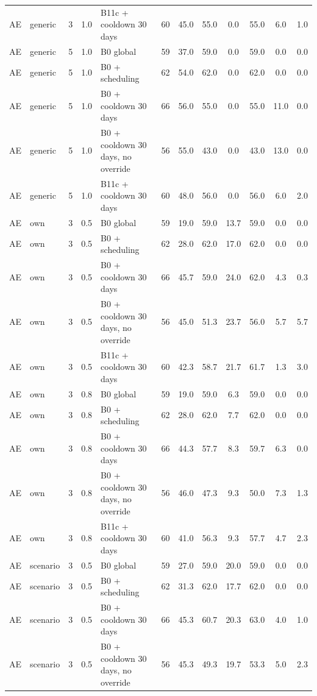 \begin{longtable}{lllllccccccc}
AE & generic & 3 & 1.0 & B11c + cooldown 30 days & 60 & 45.0 & 55.0 & 0.0 & 55.0 & 6.0 & 1.0 \\
AE & generic & 5 & 1.0 & B0 global & 59 & 37.0 & 59.0 & 0.0 & 59.0 & 0.0 & 0.0 \\
AE & generic & 5 & 1.0 & B0 + scheduling & 62 & 54.0 & 62.0 & 0.0 & 62.0 & 0.0 & 0.0 \\
AE & generic & 5 & 1.0 & B0 + cooldown 30 days & 66 & 56.0 & 55.0 & 0.0 & 55.0 & 11.0 & 0.0 \\
AE & generic & 5 & 1.0 & B0 + cooldown 30 days, no override & 56 & 55.0 & 43.0 & 0.0 & 43.0 & 13.0 & 0.0 \\
AE & generic & 5 & 1.0 & B11c + cooldown 30 days & 60 & 48.0 & 56.0 & 0.0 & 56.0 & 6.0 & 2.0 \\
AE & own & 3 & 0.5 & B0 global & 59 & 19.0 & 59.0 & 13.7 & 59.0 & 0.0 & 0.0 \\
AE & own & 3 & 0.5 & B0 + scheduling & 62 & 28.0 & 62.0 & 17.0 & 62.0 & 0.0 & 0.0 \\
AE & own & 3 & 0.5 & B0 + cooldown 30 days & 66 & 45.7 & 59.0 & 24.0 & 62.0 & 4.3 & 0.3 \\
AE & own & 3 & 0.5 & B0 + cooldown 30 days, no override & 56 & 45.0 & 51.3 & 23.7 & 56.0 & 5.7 & 5.7 \\
AE & own & 3 & 0.5 & B11c + cooldown 30 days & 60 & 42.3 & 58.7 & 21.7 & 61.7 & 1.3 & 3.0 \\
AE & own & 3 & 0.8 & B0 global & 59 & 19.0 & 59.0 & 6.3 & 59.0 & 0.0 & 0.0 \\
AE & own & 3 & 0.8 & B0 + scheduling & 62 & 28.0 & 62.0 & 7.7 & 62.0 & 0.0 & 0.0 \\
AE & own & 3 & 0.8 & B0 + cooldown 30 days & 66 & 44.3 & 57.7 & 8.3 & 59.7 & 6.3 & 0.0 \\
AE & own & 3 & 0.8 & B0 + cooldown 30 days, no override & 56 & 46.0 & 47.3 & 9.3 & 50.0 & 7.3 & 1.3 \\
AE & own & 3 & 0.8 & B11c + cooldown 30 days & 60 & 41.0 & 56.3 & 9.3 & 57.7 & 4.7 & 2.3 \\
AE & scenario & 3 & 0.5 & B0 global & 59 & 27.0 & 59.0 & 20.0 & 59.0 & 0.0 & 0.0 \\
AE & scenario & 3 & 0.5 & B0 + scheduling & 62 & 31.3 & 62.0 & 17.7 & 62.0 & 0.0 & 0.0 \\
AE & scenario & 3 & 0.5 & B0 + cooldown 30 days & 66 & 45.3 & 60.7 & 20.3 & 63.0 & 4.0 & 1.0 \\
AE & scenario & 3 & 0.5 & B0 + cooldown 30 days, no override & 56 & 45.3 & 49.3 & 19.7 & 53.3 & 5.0 & 2.3 \\

\end{longtable}
